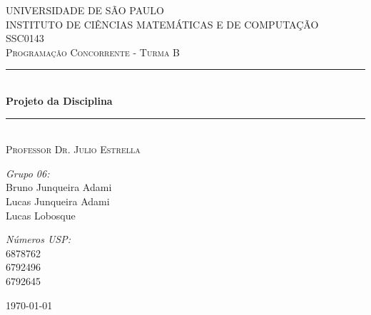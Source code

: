 \documentclass[a4paper]{article}
\newcommand{\HRule}{\rule{\linewidth}{0.5mm}}
\begin{document}
\begin{titlepage}
\begin{center}	

\textsc{\Large UNIVERSIDADE DE SÃO PAULO\\
	INSTITUTO DE CIÊNCIAS MATEMÁTICAS E DE COMPUTAÇÃO}\\[0.7cm]

\textsc{\Large SSC0143}\\[0.2cm]
\textsc{\Large Programação Concorrente - Turma B}\\[0.5cm]

\HRule \\[0.4cm]
{ \huge \bfseries Projeto da Disciplina}\\[0.4cm]
\HRule \\[0.4cm]
\textsc{Professor Dr. Julio Estrella}\\[1.5cm]

\begin{minipage}{0.4\textwidth}
\begin{flushleft} \large
\emph{Grupo 06:}\\
Bruno Junqueira Adami\\
Lucas Junqueira Adami\\
Lucas Lobosque\\
\end{flushleft}
\end{minipage}
\begin{minipage}{0.4\textwidth}
\begin{flushright} \large
\emph{Números USP:}\\
6878762\\
6792496\\
6792645\\
\end{flushright}
\end{minipage}

\vfill

{\large \today}
	
\end{center}
\end{titlepage}
\end{document}
